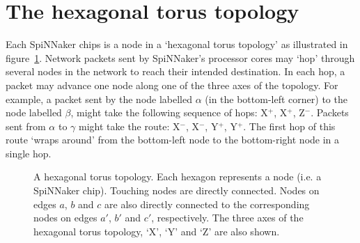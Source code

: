 	
	\section{The hexagonal torus topology}
		
		Each SpiNNaker chips is a node in a `hexagonal torus topology' as
		illustrated in figure~\ref{fig:hexagonalTorusTopology}. Network packets
		sent by SpiNNaker's processor cores may `hop' through several nodes in the
		network to reach their intended destination. In each hop, a packet may
		advance one node along one of the three axes of the topology. For example,
		a packet sent by the node labelled $\alpha$ (in the bottom-left corner) to
		the node labelled $\beta$, might take the following sequence of hops:
		X$^+$, X$^+$, Z$^-$. Packets sent from $\alpha$ to $\gamma$ might take the
		route: X$^-$, X$^-$, Y$^+$, Y$^+$. The first hop of this route `wraps
		around' from the bottom-left node to the bottom-right node in a single hop.
		
		\begin{figure}
			\center
			
			\caption[A hexagonal torus topology.]%
			{A hexagonal torus topology. Each hexagon represents a node (i.e.
			a SpiNNaker chip). Touching nodes are directly connected. Nodes on edges
			$a$, $b$ and $c$ are also directly connected to the corresponding nodes
			on edges $a'$, $b'$ and $c'$, respectively. The three axes of the
			hexagonal torus topology, `X', `Y' and `Z' are also shown.}
			\label{fig:hexagonalTorusTopology}
		\end{figure}
		

